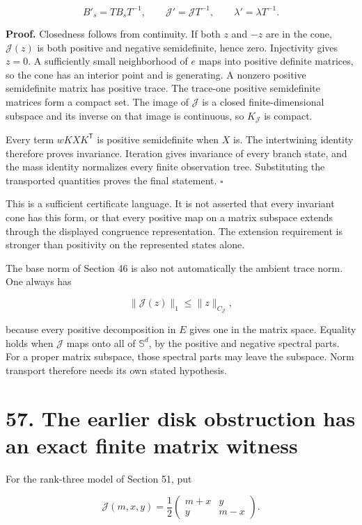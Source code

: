 \documentclass[11pt,letterpaper]{article}
\begin{document}
\[
B'_s=TB_sT^{-1},\qquad
\mathcal J'=\mathcal JT^{-1},\qquad
\lambda'=\lambda T^{-1}.
\]

\textbf{Proof.} Closedness follows from continuity. If both \(z\) and
\(-z\) are in the cone, \(\mathcal J(z)\) is both positive and negative
semidefinite, hence zero. Injectivity gives \(z=0\). A sufficiently
small neighborhood of \(e\) maps into positive definite matrices, so the
cone has an interior point and is generating. A nonzero positive
semidefinite matrix has positive trace. The trace-one positive
semidefinite matrices form a compact set. The image of \(\mathcal J\) is
a closed finite-dimensional subspace and its inverse on that image is
continuous, so \(K_{\mathcal J}\) is compact.

Every term \(wKXK^{\mathsf T}\) is positive semidefinite when \(X\) is.
The intertwining identity therefore proves invariance. Iteration gives
invariance of every branch state, and the mass identity normalizes every
finite observation tree. Substituting the transported quantities proves
the final statement. \(\square\)

This is a sufficient certificate language. It is not asserted that every
invariant cone has this form, or that every positive map on a matrix
subspace extends through the displayed congruence representation. The
extension requirement is stronger than positivity on the represented
states alone.

The base norm of Section 46 is also not automatically the ambient trace
norm. One always has

\[
\|\mathcal J(z)\|_1\leq\|z\|_{C_{\mathcal J}},
\]

because every positive decomposition in \(E\) gives one in the matrix
space. Equality holds when \(\mathcal J\) maps onto all of
\(\mathbb S^d\), by the positive and negative spectral parts. For a
proper matrix subspace, those spectral parts may leave the subspace.
Norm transport therefore needs its own stated hypothesis.

\section{57. The earlier disk obstruction has an exact finite matrix
witness}\label{the-earlier-disk-obstruction-has-an-exact-finite-matrix-witness}

For the rank-three model of Section 51, put

\[
\mathcal J(m,x,y)=\frac12
\begin{pmatrix}m+x&y\\y&m-x\end{pmatrix}.
\]
\end{document}
